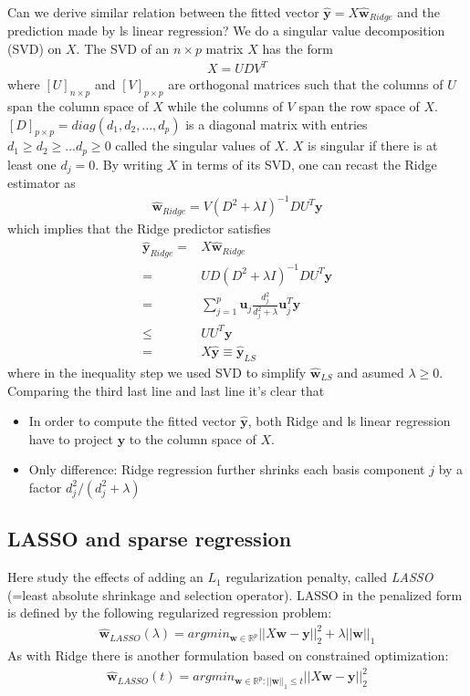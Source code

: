 \documentclass[norsk,a4paper,11pt]{article}
\begin{document}
Can we derive similar relation between the fitted vector $\hat{\mathbf{y}} = X \hat{\mathbf{w}}_{Ridge}$ and the prediction made by ls linear regression? We do a singular value decomposition (SVD) on $X$.  The SVD of an $n\times p$ matrix $X$ has the form
\begin{align}
	X = UDV^T
\end{align}
where $[U]_{n\times p}$ and $[V]_{p\times p}$ are orthogonal matrices such that the columns of $U$ span the column space of $X$ while the columns of $V$ span the row space of $X$. $[D]_{p\times p} = diag(d_1, d_2, ..., d_p)$ is a diagonal matrix with entries $d_1 \geq d_2 \geq ... d_p \geq 0$ called the singular values of $X$. $X$ is singular if there is at least one $d_j=0$. By writing $X$ in terms of its SVD, one can recast the Ridge estimator as
\begin{align}
	\hat{\mathbf{w}}_{Ridge} = V(D^2 + \lambda I)^{-1} D U^T \mathbf{y}
\end{align}
which implies that the Ridge predictor satisfies 
\begin{align}
	\hat{\mathbf{y}}_{Ridge} =& X \hat{\mathbf{w}}_{Ridge} \\
	=& UD(D^2 + \lambda I)^{-1} DU^T \mathbf{y} \\
	=& \sum_{j=1}^p \mathbf{u}_j \frac{d_j^2}{d_j^2 + \lambda} \mathbf{u}_j^T \mathbf{y} \\
	\leq& UU^T \mathbf{y} \\
	=& X \hat{\mathbf{y}} \equiv \hat{\mathbf{y}}_{LS}
\end{align}
where in the inequality step we used SVD to simplify $\hat{\mathbf{w}}_{LS}$ and asumed $\lambda \geq 0$. Comparing the third last line and last line it's clear that 
\begin{itemize}
 \item In order to compute the fitted vector $\hat{\mathbf{y}}$, both Ridge and ls linear regression have to project $\mathbf{y}$ to the column space of $X$. 
 \item Only difference: Ridge regression further shrinks each basis component $j$ by a factor $d_j^2/(d_j^2 + \lambda)$
\end{itemize}


\subsection{LASSO and sparse regression}
Here study the effects of adding an $L_1$ regularization penalty, called \textit{LASSO} (=least absolute shrinkage and selection operator). LASSO in the penalized form is defined by the following regularized regression problem:
\begin{align}
	\hat{\mathbf{w}}_{LASSO} (\lambda) = argmin_{\mathbf{w} \in \mathbb{R}^p} || X \mathbf{w} - \mathbf{y} ||_2^2 + \lambda ||\mathbf{w}||_1
\end{align}
As with Ridge there is another formulation based on constrained optimization:
\begin{align}
	\hat{\mathbf{w}}_{LASSO} (t) = argmin_{\mathbf{w} \in \mathbb{R}^p : ||\mathbf{w}||_1 \leq t} || X \mathbf{w} - \mathbf{y} ||_2^2
\end{align}
\end{document}
